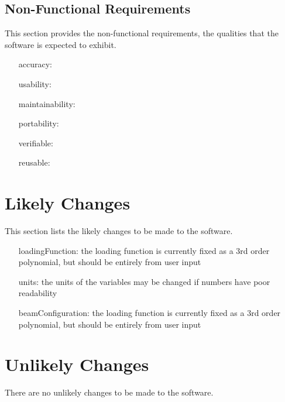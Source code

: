 \documentclass[12pt]{article}
\begin{document}
\subsection{Non-Functional Requirements}
\label{Sec:NFRs}
This section provides the non-functional requirements, the qualities that the software is expected to exhibit.

\begin{itemize}
\item[accuracy:\phantomsection\label{accuracy}]{}
\item[usability:\phantomsection\label{usability}]{}
\item[maintainability:\phantomsection\label{maintainability}]{}
\item[portability:\phantomsection\label{portability}]{}
\item[verifiable:\phantomsection\label{verifiable}]{}
\item[reusable:\phantomsection\label{reusable}]{}
\end{itemize}
\section{Likely Changes}
\label{Sec:LCs}
This section lists the likely changes to be made to the software.

\begin{itemize}
\item[loadingFunction:\phantomsection\label{loadingFunction}]{the loading function is currently fixed as a 3rd order polynomial, but should be entirely from user input}
\item[units:\phantomsection\label{units}]{the units of the variables may be changed if numbers have poor readability}
\item[beamConfiguration:\phantomsection\label{beamConfiguration}]{the loading function is currently fixed as a 3rd order polynomial, but should be entirely from user input}
\end{itemize}
\section{Unlikely Changes}
\label{Sec:UCs}
There are no unlikely changes to be made to the software.
\end{document}
